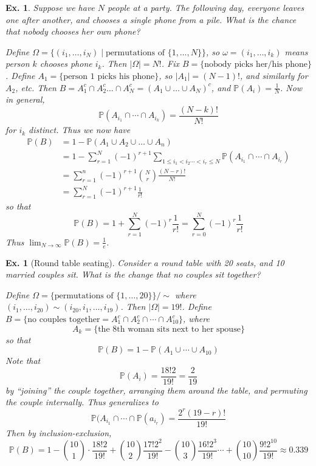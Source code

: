 \documentclass[12pt, a4paper]{book}
\renewcommand{\Pr}{\mathbb{P}}
\newtheorem{example}[theorem]{Ex.}
\theoremstyle{nonumberplain}
\begin{document}
\begin{example}
    Suppose we have $N$ people at a party.
    The following day, everyone leaves one after another, and chooses a single phone from a pile.
    What is the chance that nobody chooses her own phone?

    Define $\Omega=\{(i_1,\ldots,i_N)\mid\text{permutations of }\{1,\ldots,N\}\}$, so $\omega=(i_1,\ldots,i_k)$ means person $k$ chooses phone $i_k$.
    Then $|\Omega|=N!$.
    Fix $B=\{\text{nobody picks her/his phone}\}$.
    Define $A_1=\{\text{person 1 picks his phone}\}$, so $|A_1|=(N-1)!$, and similarly for $A_2$, etc.
    Then $B=A_1^c\cap A_2^c\ldots\cap A_N^c=(A_1\cup \ldots\cup A_N)^c$, and $\mathbb{P}(A_i)=\frac{1}{N}$.
    Now in general,
    \[\Pr(A_{i_1}\cap\cdots\cap A_{i_k})=\frac{(N-k)!}{N!}\]
    for $i_k$ distinct.
    Thus we now have
    \begin{align*}
        \Pr(B) &= 1-\Pr(A_1\cup A_2\cup\ldots\cup A_n)\\
               &= 1-\sum\limits_{r=1}^N(-1)^{r+1}\sum\limits_{1\leq i_1<i_2\cdots<i_r\leq N}\Pr(A_{i_1}\cap\cdots\cap A_{i_r})\\
                      &= \sum\limits_{r=1}^n(-1)^{r+1}\binom{N}{r}\frac{(N-r)!}{N!}\\
                      &= \sum\limits_{r=1}^N(-1)^{r+1}\frac{1}{r!}
    \end{align*}
    so that
    \[\Pr(B)=1+\sum\limits_{r=1}^N(-1)^r\frac{1}{r!}=\sum\limits_{r=0}^N(-1)^r\frac{1}{r!}\]
    Thus $\lim_{N\to\infty}\Pr(B)=\frac{1}{e}$.
\end{example}
\begin{example}[Round table seating]
    Consider a round table with 20 seats, and 10 married couples sit.
    What is the change that no couples sit together?

    Define $\Omega=\{\text{permutations of }\{1,\ldots,20\}\}/\sim$ where $(i_1,\ldots,i_{20})\sim(i_{20},i_1,\ldots,i_{19})$.
    Then $|\Omega|=19!$.
    Define $B=\{\text{no couples together}=A_1^c\cap A_2^c\cap\cdots\cap A_{10}^c\}$, where
    \[A_k=\{\text{the 8th woman sits next to her spouse}\}\]
    so that
    \[\Pr(B)=1-\Pr(A_1\cup\cdots\cup A_{10})\]
    Note that
    \[\Pr(A_i)=\frac{18!2}{19!}=\frac{2}{19}\]
    by ``joining'' the couple together, arranging them around the table, and permuting the couple internally.
    Thus generalizes to
    \[\Pr(A_{i_1}\cap\cdots\cap \Pr(a_{i_r})=\frac{2^r(19-r)!}{19!}\]
    Then by inclusion-exclusion,
    \[\Pr(B)=1-\binom{10}{1}\cdot\frac{18!2}{19!}+\binom{10}{2}\frac{17!2^2}{19!}-\binom{10}{3}\frac{16!2^3}{19!}\cdots+\binom{10}{10}\frac{9!2^{10}}{19!}\approx 0.339\]
\end{example}
\end{document}
